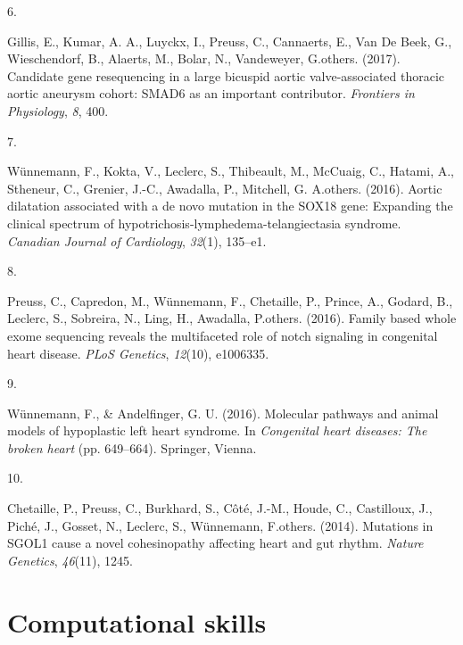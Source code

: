 \documentclass[11pt,a4paper,]{awesome-cv}
\newlength{\csllabelwidth}
\newcommand{\CSLLeftMargin}[1]{\parbox[t]{\csllabelwidth}{#1}}
\newcommand{\CSLRightInline}[1]{\parbox[t]{\linewidth - \csllabelwidth}{#1}}
\begin{document}
\leavevmode{}%
\CSLLeftMargin{6. }
\CSLRightInline{Gillis, E., Kumar, A. A., Luyckx, I., Preuss, C.,
Cannaerts, E., Van De Beek, G., Wieschendorf, B., Alaerts, M., Bolar,
N., Vandeweyer, G.others. (2017). Candidate gene resequencing in a large
bicuspid aortic valve-associated thoracic aortic aneurysm cohort: SMAD6
as an important contributor. \emph{Frontiers in Physiology}, \emph{8},
400.}

\leavevmode{}%
\CSLLeftMargin{7. }
\CSLRightInline{Wünnemann, F., Kokta, V., Leclerc, S., Thibeault, M.,
McCuaig, C., Hatami, A., Stheneur, C., Grenier, J.-C., Awadalla, P.,
Mitchell, G. A.others. (2016). Aortic dilatation associated with a de
novo mutation in the SOX18 gene: Expanding the clinical spectrum of
hypotrichosis-lymphedema-telangiectasia syndrome. \emph{Canadian Journal
of Cardiology}, \emph{32}(1), 135--e1.}

\leavevmode{}%
\CSLLeftMargin{8. }
\CSLRightInline{Preuss, C., Capredon, M., Wünnemann, F., Chetaille, P.,
Prince, A., Godard, B., Leclerc, S., Sobreira, N., Ling, H., Awadalla,
P.others. (2016). Family based whole exome sequencing reveals the
multifaceted role of notch signaling in congenital heart disease.
\emph{PLoS Genetics}, \emph{12}(10), e1006335.}

\leavevmode{}%
\CSLLeftMargin{9. }
\CSLRightInline{Wünnemann, F., \& Andelfinger, G. U. (2016). Molecular
pathways and animal models of hypoplastic left heart syndrome. In
\emph{Congenital heart diseases: The broken heart} (pp. 649--664).
Springer, Vienna.}

\leavevmode{}%
\CSLLeftMargin{10. }
\CSLRightInline{Chetaille, P., Preuss, C., Burkhard, S., Côté, J.-M.,
Houde, C., Castilloux, J., Piché, J., Gosset, N., Leclerc, S.,
Wünnemann, F.others. (2014). Mutations in SGOL1 cause a novel
cohesinopathy affecting heart and gut rhythm. \emph{Nature Genetics},
\emph{46}(11), 1245.}

\hypertarget{computational-skills}{%
\section{\texorpdfstring{ Computational
skills}{ Computational skills}}\label{computational-skills}}
\end{document}
